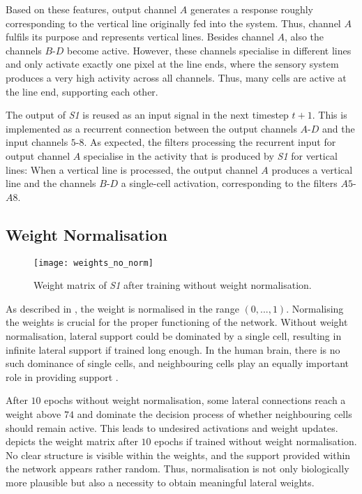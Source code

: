 Based on these features, output channel $A$ generates a response roughly corresponding to the vertical line originally fed into the system.
Thus, channel $A$ fulfils its purpose and represents vertical lines.
Besides channel $A$, also the channels $B$-$D$ become active.
However, these channels specialise in different lines and only activate exactly one pixel at the line ends, where the sensory system produces a very high activity across all channels.
Thus, many cells are active at the line end, supporting each other.

The output of \emph{S1} is reused as an input signal in the next timestep $t+1$.
This is implemented as a recurrent connection between the output channels $A$-$D$ and the input channels $5$-$8$.
As expected, the filters processing the recurrent input for output channel $A$ specialise in the activity that is produced by \emph{S1} for vertical lines:
When a vertical line is processed, the output channel $A$ produces a vertical line and the channels $B$-$D$ a single-cell activation, corresponding to the filters $A5$-$A8$.


\subsection{Weight Normalisation}
%
\begin{figure}[h]
    \centering
    \texttt{[image: weights\_no\_norm]}
    \caption[Weights after training without normalisation]{Weight matrix of \emph{S1} after training without weight normalisation.}
\end{figure}
%
As described in , the weight is normalised in the range $(0, ..., 1)$.
Normalising the weights is crucial for the proper functioning of the network. Without weight normalisation, lateral support could be dominated by a single cell, resulting in infinite lateral support if trained long enough. In the human brain, there is no such dominance of single cells, and neighbouring cells play an equally important role in providing support .

After $10$ epochs without weight normalisation, some lateral connections reach a weight above $74$ and dominate the decision process of whether neighbouring cells should remain active.
This leads to undesired activations and weight updates. 
 depicts the weight matrix after $10$ epochs if trained without weight normalisation.
No clear structure is visible within the weights, and the support provided within the network appears rather random. 
Thus, normalisation is not only biologically more plausible but also a necessity to obtain meaningful lateral weights.




